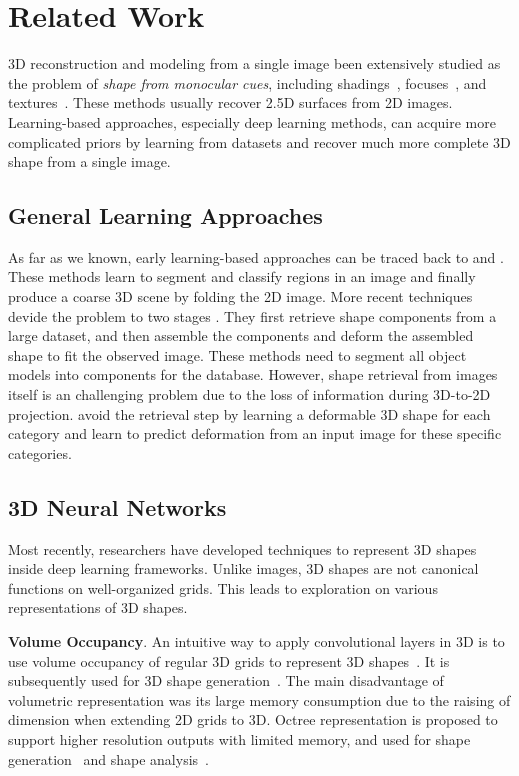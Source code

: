 \section{Related Work}
3D reconstruction and modeling from a single image  been extensively studied as the problem of \emph{shape from monocular cues}, including shadings~\cite{shapefromshadingsurvey}, focuses~\cite{shapefromdf1,shapefromdf2}, and textures~\cite{Aloimonos1988}. 
These methods usually recover 2.5D surfaces from 2D images. 
Learning-based approaches, especially deep learning methods, can acquire more complicated priors by learning from datasets and recover much more complete 3D shape from a single image.
 
\subsection{General Learning Approaches}
As far as we known, early learning-based approaches can be traced back to \cite{Hoiem2007} and \cite{learn3D2007}. These methods learn to segment and classify regions in an image and finally produce a coarse 3D scene by folding the 2D image.
%
More recent techniques devide the problem to two stages \cite{Su:2014,jointimgshape}. They first retrieve shape components from a large dataset, and then assemble the components and deform the assembled shape to fit the observed image. These methods need to segment all object models into components for the database.
%
However, shape retrieval from images itself is an challenging problem due to the loss of information during 3D-to-2D projection. 
\cite{imgrecon15} avoid the retrieval step by learning a deformable 3D shape for each category and learn to predict deformation from an input image for these specific categories.
%
\subsection{3D Neural Networks}
Most recently, researchers have developed techniques to represent 3D shapes inside deep learning frameworks. Unlike images, 3D shapes are not canonical functions on well-organized grids.
This leads to exploration on various representations of 3D shapes.

\noindent\textbf{Volume Occupancy}. 
An intuitive way to apply convolutional layers in 3D is to use volume occupancy of regular 3D grids to represent 3D shapes~\cite{3dshapenet}. It is subsequently used for 3D shape generation~\cite{3DR2N2,learnobj}.
%
The main disadvantage of volumetric representation was its large memory consumption due to the raising of dimension when extending 2D grids to 3D. 
Octree representation is proposed to support higher resolution outputs with limited memory, and used for shape generation~\cite{octreegen} and shape analysis~\cite{ocnn}.

